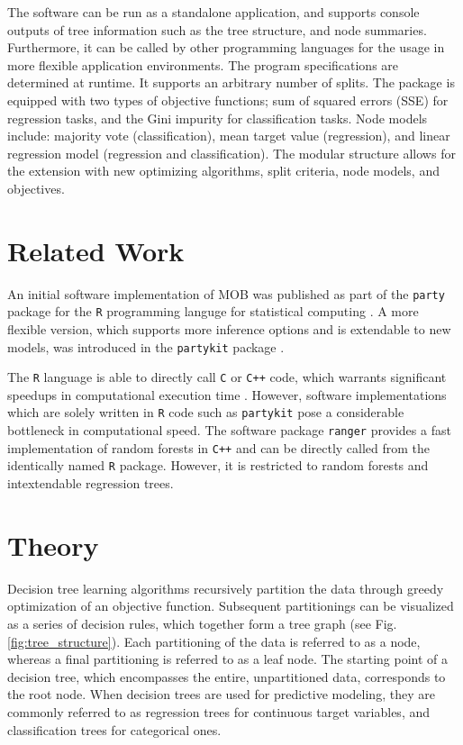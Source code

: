 \documentclass[a4paper, 11pt]{article}
\begin{document}
The software can be run as a standalone application, and supports console outputs of tree information such as the tree structure, and node summaries. Furthermore, it can be called by other programming languages for the usage in more flexible application environments. The program specifications are determined at runtime. It supports an arbitrary number of splits.
The package is equipped with two types of objective functions; sum of squared errors (SSE) for regression tasks, and the Gini impurity for classification tasks. Node models include: majority vote (classification), mean target value (regression), and linear regression model (regression and classification).
The modular structure allows for the extension with 
new optimizing algorithms, split criteria, node models, and objectives. 

\section{Related Work}

An initial software implementation of MOB was published as part of the \texttt{party} package \cite{party_package} for the \texttt{R} programming languge for statistical computing \cite{r_citation}. A more flexible version, which supports more inference options and is extendable to new models, was introduced in the \texttt{partykit} package \cite{partykit_package}. 
\par
The \texttt{R} language is able to directly call \texttt{C} or \texttt{C++} code, which warrants significant speedups in computational execution time \cite{eddelbuettel_rcpp}. However, software implementations which are solely written in \texttt{R} code such as \texttt{partykit} pose a considerable bottleneck in computational speed.
The software package \texttt{ranger} \cite{ranger_package} provides a fast implementation of random forests in \texttt{C++} and can be directly called from the identically named \texttt{R} package. However, it is restricted to random forests and intextendable regression trees.

\section{Theory}

Decision tree learning algorithms recursively partition the data through greedy optimization of an objective function. Subsequent partitionings can be visualized as a series of decision rules, which together form a tree graph (see Fig. \ref{fig:tree_structure}). Each partitioning of the data is referred to as a node, whereas a final partitioning is referred to as a leaf node. The starting point of a decision tree, which encompasses the entire, unpartitioned data, corresponds to the root node. When decision trees are used for predictive modeling, they are commonly referred to as regression trees for continuous target variables, and classification trees for categorical ones.
\end{document}
